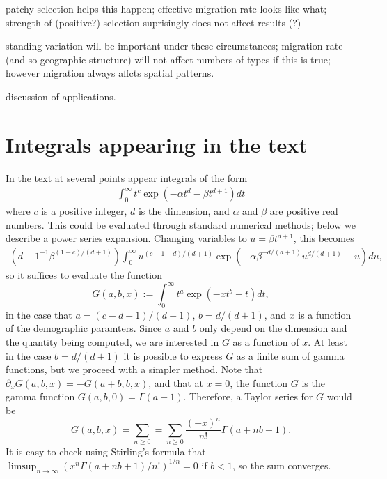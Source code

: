\documentclass{article}
\begin{document}
patchy selection helps this happen; 
effective migration rate looks like what; 
strength of (positive?) selection suprisingly does not affect results (?) 

standing variation will be important under these circumstances; 
migration rate (and so geographic structure) will not affect numbers of types if this is true; 
however migration always affcts spatial patterns. 

discussion of applications. 

\appendix

\section{Integrals appearing in the text}
    \label{apx:integrals}

In the text at several points appear integrals of the form
\begin{align}
  \int_0^\infty t^c \exp \left( - \alpha t^d - \beta t^{d+1} \right) dt 
\end{align}
where $c$ is a positive integer, $d$ is the dimension, and $\alpha$ and $\beta$ are positive real numbers.
This could be evaluated through standard numerical methods; below we describe a power series expansion.
Changing variables to $u = \beta t^{d+1}$, this becomes
\begin{align}
    \left( {d+1}^{-1} \beta^{ (1-c)/(d+1) } \right) \int_0^\infty u^{(c+1-d)/(d+1)} \exp\left( - \alpha \beta^{-d/(d+1)} u^{d/(d+1)} - u \right) du ,
\end{align}
so it suffices to evaluate the function
\begin{equation}
    G(a,b,x) := \int_0^\infty  t^a \exp\left( -x t^b - t \right) dt ,
\end{equation}
in the case that $a=(c-d+1)/(d+1)$, $b=d/(d+1)$, and $x$ is a function of the demographic paramters.
Since $a$ and $b$ only depend on the dimension and the quantity being computed,
we are interested in $G$ as a function of $x$.
At least in the case $b=d/(d+1)$ it is possible to express $G$ as a finite sum of gamma functions,
but we proceed with a simpler method.
Note that $\partial_x G(a,b,x) = -G(a+b,b,x)$,
and that at $x=0$, the function $G$ is the gamma function $G(a,b,0) = \Gamma(a+1)$.
Therefore, a Taylor series for $G$ would be
\[
    G(a,b,x) = \sum_{n \ge 0} = \sum_{n \ge 0} \frac{(-x)^n}{n!} \Gamma(a+nb+1) .
\]
It is easy to check using Stirling's formula that $\limsup_{n \to \infty} ( x^n \Gamma(a+nb+1)/n! )^{1/n} = 0$
if $b<1$, so the sum converges.
\end{document}
